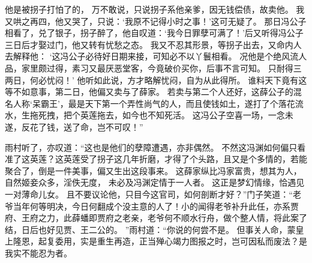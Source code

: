 他是被拐子打怕了的，
万不敢说，只说拐子系他亲爹，因无钱偿债，故卖他。
我又哄之再四，他又哭了，只说：‘我原不记得小时之事！’这可无疑了。
那日冯公子相看了，兑了银子，拐子醉了，他自叹道：‘我今日罪孽可满了！’后又听得冯公子三日后才娶过门，他又转有忧愁之态。
我又不忍其形景，等拐子出去，又命内人去解释他：
‘这冯公子必待好日期来接，可知必不以丫鬟相看。
况他是个绝风流人品，家里颇过得，素习又最厌恶堂客，今竟破价买你，后事不言可知。
只耐得三两日，何必忧闷！’
他听如此说，方才略解忧闷，自为从此得所。
谁料天下竟有这等不如意事，第二日，他偏又卖与了薛家。
若卖与第二个人还好，这薛公子的混名人称‘呆霸王’，最是天下第一个弄性尚气的人，而且使钱如土，遂打了个落花流水，生拖死拽，把个英莲拖去，如今也不知死活。
这冯公子空喜一场，一念未遂，反花了钱，送了命，岂不可叹！”\par
雨村听了，亦叹道：“这也是他们的孽障遭遇，亦非偶然。
不然这冯渊如何偏只看准了这英莲？这英莲受了拐子这几年折磨，才得了个头路，且又是个多情的，若能聚合了，倒是一件美事，偏又生出这段事来。
这薛家纵比冯家富贵，想其为人，自然姬妾众多，淫佚无度，
未必及冯渊定情于一人者。
这正是梦幻情缘，恰遇见一对薄命儿女。
且不要议论他，只目今这官司，如何剖断才好？”门子笑道：“老爷当年何等明决，今日何翻成个没主意的人了！小的闻得老爷补升此任，亦系贾府、王府之力，此薛蟠即贾府之老亲，老爷何不顺水行舟，做个整人情，将此案了结，日后也好见贾、王二公的。
”雨村道：“你说的何尝不是。
但事关人命，蒙皇上隆恩，起复委用，实是重生再造，正当殚心竭力图报之时，岂可因私而废法？是我实不能忍为者。
